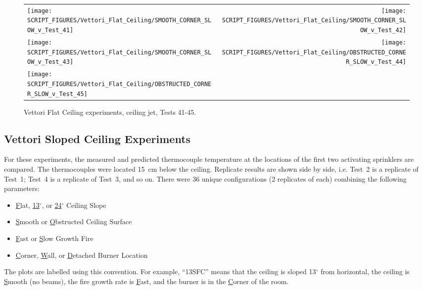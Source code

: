 \begin{figure}[p]
\begin{tabular*}{\textwidth}{l@{\extracolsep{\fill}}r}
\texttt{[image: SCRIPT\_FIGURES/Vettori\_Flat\_Ceiling/SMOOTH\_CORNER\_SLOW\_v\_Test\_41]} &
\texttt{[image: SCRIPT\_FIGURES/Vettori\_Flat\_Ceiling/SMOOTH\_CORNER\_SLOW\_v\_Test\_42]} \\
\texttt{[image: SCRIPT\_FIGURES/Vettori\_Flat\_Ceiling/SMOOTH\_CORNER\_SLOW\_v\_Test\_43]} &
\texttt{[image: SCRIPT\_FIGURES/Vettori\_Flat\_Ceiling/OBSTRUCTED\_CORNER\_SLOW\_v\_Test\_44]} \\
\texttt{[image: SCRIPT\_FIGURES/Vettori\_Flat\_Ceiling/OBSTRUCTED\_CORNER\_SLOW\_v\_Test\_45]} \\
\end{tabular*}
\caption[Vettori Flat Ceiling experiments, ceiling jet, Tests 41-45]{Vettori Flat Ceiling experiments, ceiling jet, Tests 41-45.}
\label{Vettori_6}
\end{figure}


\clearpage

\subsection{Vettori Sloped Ceiling Experiments}
\label{Vettori_Sloped_Results}

For these experiments, the measured and predicted thermocouple temperature at the locations of the first two activating sprinklers are compared. The thermocouples were located 15~cm below the ceiling. Replicate results are shown side by side, i.e. Test~2 is a replicate of Test~1; Test~4 is a replicate of Test~3, and so on. There were 36 unique configurations (2 replicates of each) combining the following parameters:
\begin{itemize}
\item \underline{F}lat, \underline{13}$^\circ$, or \underline{24}$^\circ$ Ceiling Slope
\item \underline{S}mooth or \underline{O}bstructed Ceiling Surface
\item \underline{F}ast or \underline{S}low Growth Fire
\item \underline{C}orner, \underline{W}all, or \underline{D}etached Burner Location
\end{itemize}
The plots are labelled using this convention. For example, ``13SFC'' means that the ceiling is sloped 13$^\circ$ from horizontal, the ceiling is \underline{S}mooth (no beams), the fire growth rate is \underline{F}ast, and the burner is in the \underline{C}orner of the room.

